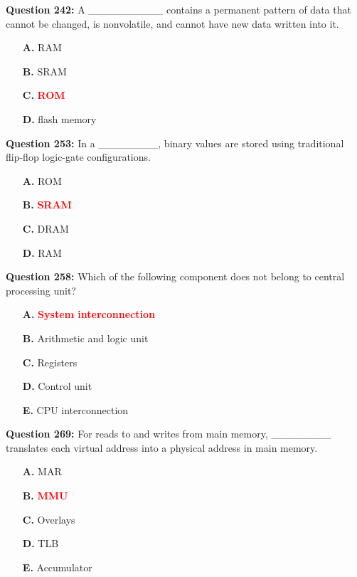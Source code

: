 \documentclass[12pt,a4paper]{article}
\begin{document}
\vspace{0.5cm}

\textbf{Question 242:} A __________ contains a permanent pattern of data that cannot be changed, is nonvolatile, and cannot have new data written into it.

\begin{itemize}
    \item[\textbf{A.}] RAM
    \item[\textbf{B.}] SRAM
    \item[\textbf{C.}] \textcolor{red}{\textbf{ROM}}
    \item[\textbf{D.}] flash memory
\end{itemize}

\vspace{0.5cm}

\textbf{Question 253:} In a ________, binary values are stored using traditional flip-flop logic-gate configurations.

\begin{itemize}
    \item[\textbf{A.}] ROM
    \item[\textbf{B.}] \textcolor{red}{\textbf{SRAM}}
    \item[\textbf{C.}] DRAM
    \item[\textbf{D.}] RAM
\end{itemize}

\vspace{0.5cm}

\textbf{Question 258:} Which of the following component does not belong to central processing unit?

\begin{itemize}
    \item[\textbf{A.}] \textcolor{red}{\textbf{System interconnection}}
    \item[\textbf{B.}] Arithmetic and logic unit
    \item[\textbf{C.}] Registers
    \item[\textbf{D.}] Control unit
    \item[\textbf{E.}] CPU interconnection
\end{itemize}

\vspace{0.5cm}

\textbf{Question 269:} For reads to and writes from main memory, ________ translates each virtual address into a physical address in main memory.

\begin{itemize}
    \item[\textbf{A.}] MAR
    \item[\textbf{B.}] \textcolor{red}{\textbf{MMU}}
    \item[\textbf{C.}] Overlays
    \item[\textbf{D.}] TLB
    \item[\textbf{E.}] Accumulator
\end{itemize}
\end{document}
